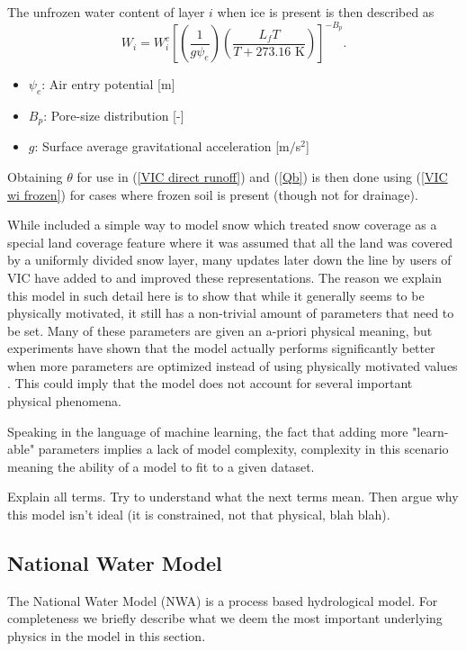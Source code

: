 The unfrozen  water content of layer $i$ when ice is present is then described as 
\begin{equation}
    W_i = W_i^c \left[ \left( \frac{1}{g \psi_e} \right) \left( \frac{L_fT}{T+273.16
    \text{ K}}  \right) \right]^{-B_p}. \label{VIC wi frozen}
\end{equation}

\begin{itemize}
    \item $\psi_e$: Air entry potential [m]
    \item $B_p$: Pore-size distribution [-]
    \item $g$: Surface average gravitational acceleration [m$/$s$^2$]
\end{itemize}
Obtaining $\theta$ for use in (\ref{VIC direct runoff}) and (\ref{Qb}) is then done 
using (\ref{VIC wi frozen}) for cases where frozen soil is present (though not for 
drainage). 

While \cite{VIC} included a simple way to model snow which treated snow coverage as 
a special land coverage feature where it was assumed that all the land was covered 
by a uniformly divided snow layer, many updates later down the line by users of VIC 
have added to and improved these representations. 
The reason we explain this model in such detail here is to show that while it 
generally seems to be physically motivated, it still has a non-trivial amount of 
parameters that need to be set. Many of these parameters are given an a-priori 
physical meaning, but experiments have shown that the model actually performs 
significantly better when more parameters are optimized instead of using physically 
motivated values \cite{VICbench}. This could imply that the model does not account 
for several important physical phenomena.

Speaking in the language of machine learning, the fact that adding more "learn-able" 
parameters implies a lack of model complexity, complexity in this scenario 
meaning the ability of a model to fit to a given dataset.

Explain all terms. Try to understand what the next terms mean. Then argue why 
this model isn't ideal (it is constrained, not that physical, blah blah).
\subsection{National Water Model}
The National Water Model (NWA) is a process based hydrological model. For completeness 
we briefly describe what we deem the most important underlying physics in the model 
in this section.


